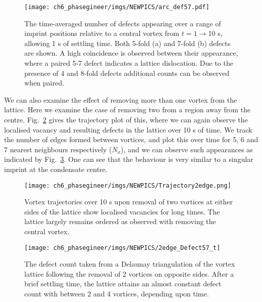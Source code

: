 \begin{figure} \centering
    \texttt{[image: ch6\_phasegineer/imgs/NEWPICS/arc\_def57.pdf]}
    \caption{The time-averaged number of defects appearing over a range of imprint positions relative to a central vortex from $t=1\rightarrow$10 s, allowing 1 s of settling time. Both 5-fold (a) and 7-fold (b) defects are shown. A high coincidence is observed between their appearance, where a paired 5-7 defect indicates a lattice dislocation. Due to the presence of 4 and 8-fold defects additional counts can be observed when paired.} \label{fig:lattice_misalign}
\end{figure}

We can also examine the effect of removing more than one vortex from the lattice. Here we examine the case of removing two from a region away from the centre. Fig.~\ref{fig:traj_2vtx_edge} gives the trajectory plot of this, where we can again observe the localised vacancy and resulting defects in the lattice over 10 s of time. We track the number of edges formed between vortices, and plot this over time for 5, 6 and 7 nearest neighbours respectively ($N_x$), and we can observe such appearances as indicated by Fig.~\ref{fig:vtx_rem2_edge}. One can see that the behaviour is very similar to a singular imprint at the condensate centre.

\begin{figure} \centering
    \texttt{[image: ch6\_phasegineer/imgs/NEWPICS/Trajectory2edge.png]}
    \caption{Vortex trajectories over 10 s upon removal of two vortices at either sides of the lattice show localised vacancies for long times. The lattice largely remains ordered as observed with removing the central vortex.}\label{fig:traj_2vtx_edge}
\end{figure}

\begin{figure} \centering
    \texttt{[image: ch6\_phasegineer/imgs/NEWPICS/2edge\_Defect57\_t]}
    \caption{The defect count taken from a Delaunay triangulation of the vortex lattice following the removal of 2 vortices on opposite sides. After a brief settling time, the lattice attains an almost constant defect count with between 2 and 4 vortices, depending upon time.}\label{fig:remove7_defect}
    \label{fig:vtx_rem2_edge}
\end{figure}


